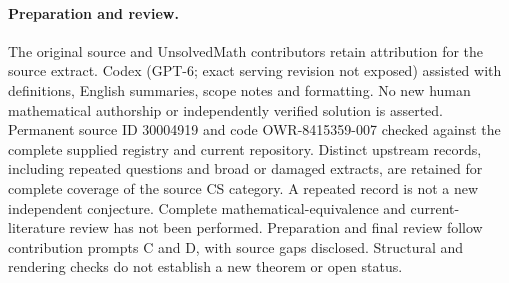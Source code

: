 \documentclass[11pt]{article}
\begin{document}
\paragraph{Preparation and review.}
The original source and UnsolvedMath contributors retain attribution for the source extract. Codex (GPT-6; exact serving revision not exposed) assisted with definitions, English summaries, scope notes and formatting. No new human mathematical authorship or independently verified solution is asserted. Permanent source ID 30004919 and code OWR-8415359-007 checked against the complete supplied registry and current repository. Distinct upstream records, including repeated questions and broad or damaged extracts, are retained for complete coverage of the source CS category. A repeated record is not a new independent conjecture. Complete mathematical-equivalence and current-literature review has not been performed. Preparation and final review follow contribution prompts C and D, with source gaps disclosed. Structural and rendering checks do not establish a new theorem or open status.
\label{end:30004919}
\end{document}
